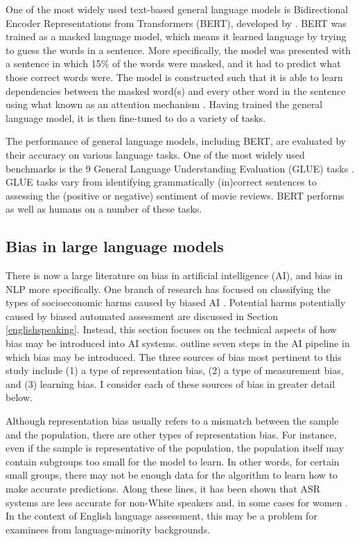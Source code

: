 \documentclass [PhD] {uclathes}
\begin{document}
One of the most widely used text-based general language models is Bidirectional Encoder Representations from Transformers (BERT), developed by \citet{devlin2018}. BERT was trained as a masked language model, which means it learned language by trying to guess the words in a sentence. More specifically, the model was presented with a sentence in which 15\% of the words were masked, and it had to predict what those correct words were. The model is constructed such that it is able to learn dependencies between the masked word(s) and every other word in the sentence using what known as an attention mechanism \citep{vaswani2017attention}. Having trained the general language model, it is then fine-tuned to do a variety of tasks.

The performance of general language models, including BERT, are evaluated by their accuracy on various language tasks. One of the most widely used benchmarks is the 9 General Language Understanding Evaluation (GLUE) tasks \citep{wang2018glue}. GLUE tasks vary from identifying grammatically (in)correct sentences to assessing the (positive or negative) sentiment of movie reviews. BERT performs as well as humans on a number of these tasks.

\subsection{Bias in large language models}
\label{lit_ml_bias}

There is now a large literature on bias in artificial intelligence (AI), and bias in NLP more specifically. One branch of research has focused on classifying the types of socioeconomic harms caused by biased AI \citep[e.g.][]{blodgett2020}. Potential harms potentially caused by biased automated assessment are discussed in Section \ref{englishspeaking}. Instead, this section focuses on the technical aspects of how bias may be introduced into AI systems. \citet{suresh2021framework} outline seven steps in the AI pipeline in which bias may be introduced. The three sources of bias most pertinent to this study include (1) a type of representation bias, (2) a type of measurement bias, and (3) learning bias. I consider each of these sources of bias in greater detail below.

Although representation bias usually refers to a mismatch between the sample and the population, there are other types of representation bias. For instance, even if the sample is representative of the population, the population itself may contain subgroups too small for the model to learn. In other words, for certain small groups, there may not be enough data for the algorithm to learn how to make accurate predictions. Along these lines, it has been shown that ASR systems are less accurate for non-White speakers \citep{koenecke2020} and, in some cases for women \citep{tatman2017a, tatman2017b}. In the context of English language assessment, this may be a problem for examinees from language-minority backgrounds.
\end{document}
